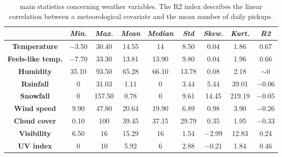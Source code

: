\begin{table}[h!]
	\centering
	\renewcommand\arraystretch{1.3}
	\begin{tabular}{c|c|c|c|c|c|c|c|c}
		\hline
		\textit{} & \textit{Min.} & \textit{Max.} & \textit{Mean} & \textit{Median} & \textit{Std} & \textit{Skew.}  & \textit{Kurt.} & \textit{R2} \\
		\hline
		\textbf{Temperature} & \num{-3.50} & \num{30.40} & \num{14.55} & \num{14} & \num{8.50} & \num{0.04} & \num{1.86} & \num{0.67} \\
		\hline
		\textbf{Feels-like temp.} & \num{-7.70} & \num{33.30} & \num{13.81} & \num{13.90} & \num{9.80} & \num{0.04} & \num{1.96} & \num{0.66} \\
		\hline
		\textbf{Humidity} & \num{35.10} & \num{93.50} & \num{65.28} & \num{66.10} & \num{13.78} & \num{0.08} & \num{2.18} & $\sim 0$ \\
		\hline
		\textbf{Rainfall} & \num{0} & \num{31.03} & \num{1.11} & \num{0} & \num{3.44} & \num{5.44} & \num{39.01} & \num{-0.06} \\
		\hline
		\textbf{Snowfall} & \num{0} & \num{157.50} & \num{0.78} & \num{0} & \num{9.61} & \num{14.45} & \num{219.19} & \num{-0.05} \\
		\hline
		\textbf{Wind speed} & \num{9.90} & \num{47.80} & \num{20.64} & \num{19.90} & \num{6.89} & \num{0.98} & \num{3.90} & \num{-0.26} \\
		\hline
		\textbf{Cloud cover} & \num{0.10} & \num{100} & \num{39.45} & \num{37.15} & \num{29.79} & \num{0.35} &\num{ 1.95} & \num{-0.33} \\
		\hline
		\textbf{Visibility} & \num{6.50} & \num{16} & \num{15.29} & \num{16} & \num{1.54} & \num{-2.99} & \num{12.83} & \num{0.24} \\
		\hline
		\textbf{UV index} & \num{ 0} & \num{10} & \num{5.92} & \num{6} & \num{2.88} & \num{-0.21} & \num{1.84} & \num{0.46} \\
		\hline
	\end{tabular}
	\caption[Main statistics concerning weather variables]{main statistics concerning weather variables. The R2 index describes the linear correlation between a meteorological covariate and the mean number of daily pickups.}
	\label{Weather_stats}
\end{table}

